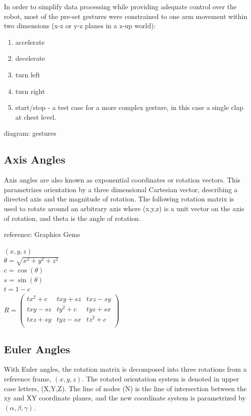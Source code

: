 \documentclass[12pt,a4,notitlepage]{report}
\renewcommand{\_}{\texttt{\symbol{95}}}
\newcommand{\<}{\texttt{\symbol{60}}}
\renewcommand{\>}{\texttt{\symbol{62}}}
\begin{document}
In order to simplify data processing while providing adequate control over the robot, most of the pre-set gestures were constrained to one arm movement within two dimensions (x-z or y-z planes in a z-up world):
\begin{enumerate}
\item accelerate
\item decelerate
\item turn left
\item turn right
\item start/stop - a test case for a more complex gesture, in this case a single clap at chest level.
\end{enumerate}
{diagram: gestures}

\subsection{Axis Angles}

Axis angles are also known as exponential coordinates or rotation vectors. This parametrizes orientation by a three dimensional Cartesian vector, describing a directed axis and the magnitude of rotation. The following rotation matrix is used to rotate around an arbitrary axis where (x,y,z) is a unit vector on the axis of rotation, and theta is the angle of rotation.

{reference: Graphics Gems}

$(x,y,z)$\\

$\theta = \sqrt{x^2 + y^2 + z^2}$\\

$c = \cos(\theta)$\\
$s = \sin(\theta)$\\
$t = 1-c $\\

$R =
\left( \begin{array}{ccc}
      tx^2+c & txy+sz & txz-sy\\
		txy-sz & ty^2+c & tyz+sx\\
		txz+sy & tyz-sx & tz^2+c\\
\end{array} \right)$

\subsection{Euler Angles}

With Euler angles, the rotation matrix is decomposed into three rotations from a reference frame, $(x,y,z)$. The rotated orientation system is denoted in upper case letters, (X,Y,Z). The line of nodes (N) is the line of intersection between the xy and XY coordinate planes, and the new coordinate system is parametrized by $(\alpha,\beta,\gamma)$.
\end{document}

